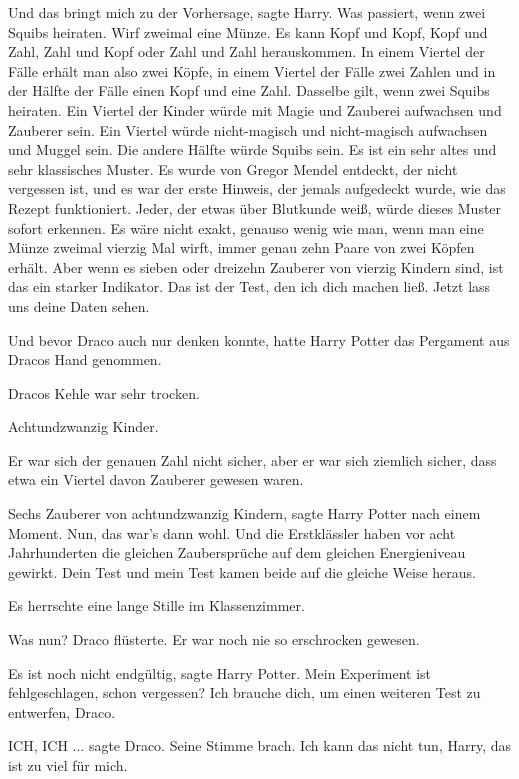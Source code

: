 \glqq{}Und das bringt mich zu der Vorhersage\grqq{}, sagte Harry. \glqq{}Was
passiert, wenn zwei Squibs heiraten. Wirf zweimal eine Münze. Es kann Kopf und
Kopf, Kopf und Zahl, Zahl und Kopf oder Zahl und Zahl herauskommen. In einem
Viertel der Fälle erhält man also zwei Köpfe, in einem Viertel der Fälle zwei
Zahlen und in der Hälfte der Fälle einen Kopf und eine Zahl. Dasselbe gilt, wenn
zwei Squibs heiraten. Ein Viertel der Kinder würde mit Magie und Zauberei
aufwachsen und Zauberer sein. Ein Viertel würde nicht-magisch und nicht-magisch
aufwachsen und Muggel sein. Die andere Hälfte würde Squibs sein. Es ist ein sehr
altes und sehr klassisches Muster. Es wurde von Gregor Mendel entdeckt, der
nicht vergessen ist, und es war der erste Hinweis, der jemals aufgedeckt wurde,
wie das Rezept funktioniert. Jeder, der etwas über Blutkunde weiß, würde dieses
Muster sofort erkennen. Es wäre nicht exakt, genauso wenig wie man, wenn man
eine Münze zweimal vierzig Mal wirft, immer genau zehn Paare von zwei Köpfen
erhält. Aber wenn es sieben oder dreizehn Zauberer von vierzig Kindern sind, ist
das ein starker Indikator. Das ist der Test, den ich dich machen ließ. Jetzt
lass uns deine Daten sehen.\grqq{}

Und bevor Draco auch nur denken konnte, hatte Harry Potter das Pergament aus
Dracos Hand genommen.

Dracos Kehle war sehr trocken.

Achtundzwanzig Kinder.

Er war sich der genauen Zahl nicht sicher, aber er war sich ziemlich sicher,
dass etwa ein Viertel davon Zauberer gewesen waren.

\glqq{}Sechs Zauberer von achtundzwanzig Kindern\grqq{}, sagte Harry Potter nach
einem Moment. \glqq{}Nun, das war's dann wohl. Und die Erstklässler haben vor
acht Jahrhunderten die gleichen Zaubersprüche auf dem gleichen Energieniveau
gewirkt. Dein Test und mein Test kamen beide auf die gleiche Weise
heraus.\grqq{}

Es herrschte eine lange Stille im Klassenzimmer.

\glqq{}Was nun?\grqq{} Draco flüsterte. Er war noch nie so erschrocken gewesen.

\glqq{}Es ist noch nicht endgültig\grqq{}, sagte Harry Potter. \glqq{}Mein
Experiment ist fehlgeschlagen, schon vergessen? Ich brauche dich, um einen
weiteren Test zu entwerfen, Draco.\grqq{}

\glqq{}ICH, ICH ...\grqq{} sagte Draco. Seine Stimme brach. \glqq{}Ich kann das
nicht tun, Harry, das ist zu viel für mich.\grqq{}

